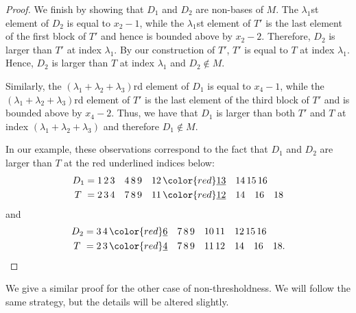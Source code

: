 \documentclass{amsart}
\theoremstyle{definition}
\theoremstyle{plain}
\begin{document}
\begin{proof}
We finish by showing that $D_1$ and $D_2$ are non-bases of $M$. The $\lambda_1$st element of $D_2$ is equal to $x_2-1$, while the $\lambda_1$st element of $T'$ is the last element of the first block of $T'$ and hence is bounded above by $x_2-2$. Therefore, $D_2$ is larger than $T'$ at index $\lambda_1$. By our construction of $T'$, $T'$ is equal to $T$ at index $\lambda_1$. Hence, $D_2$ is larger than $T$ at index $\lambda_1$ and $D_2\not\in M$. 

Similarly, the $(\lambda_1+\lambda_2+\lambda_3)$rd element of $D_1$ is equal to $x_4-1$, while the $(\lambda_1+\lambda_2+\lambda_3)$rd element of $T'$ is the last element of the third block of $T'$ and is bounded above by $x_4-2$. Thus, we have that $D_1$ is larger than both $T'$ and $T$ at index $(\lambda_1+\lambda_2+\lambda_3)$ and therefore $D_1\not\in M $.

In our example, these observations correspond to the fact that $D_1$ and $D_2$ are larger than $T$ at the red underlined indices below:
\begin{align*}
D_1 = 1\,2\,3\quad 4\, 8\,9\quad 12\,&{\color{red} \underline{13}}\quad 14\,15\,16\\
T\,\,= 2\,3\,4\quad7\,8\,9\quad 11\,&{\color{red}\underline{12}} \quad 14\quad 16\quad 18
\end{align*}
and 
\begin{align*}
D_2 = 3\,4\, &{\color{red}\underline{6}}\quad 7\,8\,9\quad 10\,11\quad 12\, 15\,16\\
T\,\,= 2\,3\,&{\color{red}\underline{4}}\quad7\,8\,9\quad 11\,12 \quad 14\quad 16\quad 18.
\end{align*}
\end{proof}

We give a similar proof for the other case of non-thresholdness. We will follow the same strategy, but the details will be altered slightly.
\end{document}
